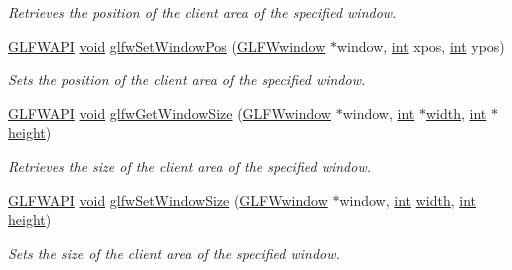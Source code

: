 \begin{DoxyCompactItemize}
\begin{DoxyCompactList}\small\item\em Retrieves the position of the client area of the specified window. \end{DoxyCompactList}\item 
\hyperlink{glfw3_8h_a56da5036b2cc259351ae22fd6439bb47}{G\-L\-F\-W\-A\-P\-I} \hyperlink{wglew_8h_aeea6e3dfae3acf232096f57d2d57f084}{void} \hyperlink{group__window_ga0dc8d880a0d87be16d3ea8114561f6f0}{glfw\-Set\-Window\-Pos} (\hyperlink{group__window_ga3c96d80d363e67d13a41b5d1821f3242}{G\-L\-F\-Wwindow} $\ast$window, \hyperlink{wglew_8h_a500a82aecba06f4550f6849b8099ca21}{int} xpos, \hyperlink{wglew_8h_a500a82aecba06f4550f6849b8099ca21}{int} ypos)
\begin{DoxyCompactList}\small\item\em Sets the position of the client area of the specified window. \end{DoxyCompactList}\item 
\hyperlink{glfw3_8h_a56da5036b2cc259351ae22fd6439bb47}{G\-L\-F\-W\-A\-P\-I} \hyperlink{wglew_8h_aeea6e3dfae3acf232096f57d2d57f084}{void} \hyperlink{group__window_ga7feb769ebb3f3d21579b5a3fb07be76e}{glfw\-Get\-Window\-Size} (\hyperlink{group__window_ga3c96d80d363e67d13a41b5d1821f3242}{G\-L\-F\-Wwindow} $\ast$window, \hyperlink{wglew_8h_a500a82aecba06f4550f6849b8099ca21}{int} $\ast$\hyperlink{glew_8h_aa105b18f96e6bc2485cb7f576a7fb9ba}{width}, \hyperlink{wglew_8h_a500a82aecba06f4550f6849b8099ca21}{int} $\ast$\hyperlink{glew_8h_aa214bd63e12f7ddf524c83894fcc69a7}{height})
\begin{DoxyCompactList}\small\item\em Retrieves the size of the client area of the specified window. \end{DoxyCompactList}\item 
\hyperlink{glfw3_8h_a56da5036b2cc259351ae22fd6439bb47}{G\-L\-F\-W\-A\-P\-I} \hyperlink{wglew_8h_aeea6e3dfae3acf232096f57d2d57f084}{void} \hyperlink{group__window_gae54d1f4915ded15e267ddd3f41496cd2}{glfw\-Set\-Window\-Size} (\hyperlink{group__window_ga3c96d80d363e67d13a41b5d1821f3242}{G\-L\-F\-Wwindow} $\ast$window, \hyperlink{wglew_8h_a500a82aecba06f4550f6849b8099ca21}{int} \hyperlink{glew_8h_aa105b18f96e6bc2485cb7f576a7fb9ba}{width}, \hyperlink{wglew_8h_a500a82aecba06f4550f6849b8099ca21}{int} \hyperlink{glew_8h_aa214bd63e12f7ddf524c83894fcc69a7}{height})
\begin{DoxyCompactList}\small\item\em Sets the size of the client area of the specified window. \end{DoxyCompactList}\item 

\end{DoxyCompactItemize}
